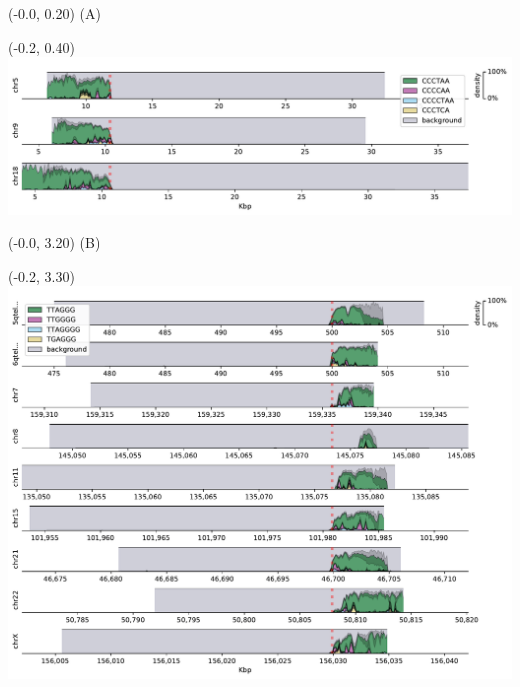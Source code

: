 \documentclass{article}
\begin{document}
\begin{textblock}{13}(-0.0,  0.20) \LARGE{(A)} \end{textblock}
\begin{textblock}{13}(-0.2,  0.40) \includegraphics[width=.7\textwidth,keepaspectratio]{densityplots/HG007-densityplot-p_arm.pdf}   \end{textblock}

\begin{textblock}{13}(-0.0,  3.20) \LARGE{(B)} \end{textblock}
\begin{textblock}{13}(-0.2,  3.30) \includegraphics{densityplots/HG007-densityplot-q_arm.pdf}   \end{textblock}
\end{document}
